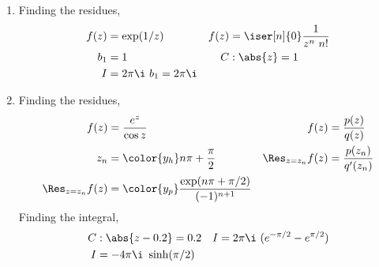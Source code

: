 \begin{enumerate}
    \item Finding the residues,
          \begin{align}
              f(z) & = \exp(1/z)                     &
              f(z) & = \iser[n]{0} \frac{1}{z^n\ n!}   \\
              b_1  & = 1                             &
              C    & : \abs{z} = 1                     \\
              I    & = 2\pi\i\ b_1 = 2\pi \i
          \end{align}

    \item Finding the residues,
          \begin{align}
              f(z)                & = \frac{e^z}{\cos z}                    &
              f(z)                & = \frac{p(z)}{q(z)}                       \\
              z_n                 & = \color{y_h} n\pi + \frac{\pi}{2}      &
              \Res_{z = z_n} f(z) & = \frac{p(z_n)}{q'(z_n)}                  \\
              \Res_{z = z_n} f(z) & = \color{y_p} \frac{\exp(n\pi + \pi/2)}
              {(-1)^{n+1}}
          \end{align}
          Finding the integral,
          \begin{align}
              C & : \abs{z - 0.2} = 0.2              &
              I & = 2\pi\i\ (e^{-\pi/2} - e^{\pi/2})   \\
              I & = -4\pi\i\ \sinh(\pi/2)
          \end{align}


\end{enumerate}
